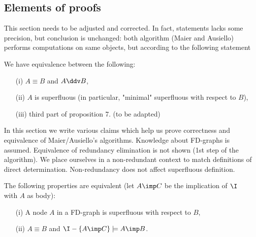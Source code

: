 \subsection{Elements of proofs}

{\color{alizarine}
This section needs to be adjusted and corrected. In fact, statements lacks
some precision, but conclusion is unchanged: both algorithm (Maier and 
Ausiello) performs computations on same objects, but according to the 
following statement 

\begin{proposition} We have equivalence between the following:
\begin{itemize}
	\item[(i)] $A \equiv B$ and $A \ddv B$,
	\item[(ii)] $A$ is superfluous (in particular, "minimal" superfluous with 
	respect to $B$),
	\item[(iii)] third part of proposition 7. (to be adapted)
\end{itemize}
	
\end{proposition}	
	
	
}

In this section we write various claims which help us prove correctness and 
equivalence of Maier/Ausiello's algorithms. Knowledge about FD-graphs is 
assumed. Equivalence of redundancy elimination is not shown (1st step of 
the algorithm). We place ourselves in a non-redundant context to match
definitions of direct determination. Non-redundancy does not affect superfluous
definition.

\begin{proposition} \label{prop:maier.equiv_sup_sub} The following properties
are equivalent (let $A \imp C$ be the implication of $\I$ with $A$ as
body):
\begin{itemize}
	\item[(i)] A node $A$ in a FD-graph is superfluous with respect to $B$,
	\item[(ii)] $A \equiv B$ and $\I - \{A \imp C \} \models A \imp B$.
\end{itemize}
\end{proposition}


